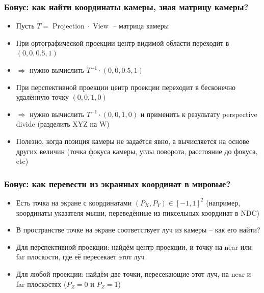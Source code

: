 \documentclass[10pt]{beamer}
\begin{document}
\begin{frame}[fragile]
\frametitle{Бонус: как найти координаты камеры, зная матрицу камеры?}
\begin{itemize}
\item Пусть \begin{math}T=\operatorname{Projection}\cdot\operatorname{View}\end{math} -- матрица камеры
\pause
\item При ортографической проекции центр видимой области переходит в \begin{math}(0,0,0.5,1)\end{math}
\pause
\item \begin{math}\Longrightarrow\end{math} нужно вычислить \begin{math}T^{-1} \cdot (0,0,0.5,1)\end{math}
\pause
\item При перспективной проекции центр проекции переходит в бесконечно удалённую точку \begin{math}(0,0,1,0)\end{math}
\pause
\item \begin{math}\Longrightarrow\end{math} нужно вычислить \begin{math}T^{-1} \cdot (0,0,1,0)\end{math} и применить к результату perspective divide (разделить XYZ на W)
\pause
\item Полезно, когда позиция камеры не задаётся явно, а вычисляется на основе других величин (точка фокуса камеры, углы поворота, расстояние до фокуса, etc)
\end{itemize}
\end{frame}

\begin{frame}[fragile]
\frametitle{Бонус: как перевести из экранных координат в мировые?}
\begin{itemize}
\item Есть точка на экране с координатами \begin{math}(P_X, P_Y) \in [-1, 1]^2\end{math} (например, координаты указателя мыши, переведённые из пиксельных координат в NDC)
\pause
\item В пространстве точке на экране соответствует луч из камеры -- как его найти?
\pause
\item Для перспективной проекции: найдём центр проекции, и точку на near или far плоскости, где её пересекает этот луч
\pause
\item Для любой проекции: найдём две точки, пересекающие этот луч, на near и far плоскостях (\(P_Z=0\) и \(P_Z=1\))
\end{itemize}
\end{frame}
\end{document}
